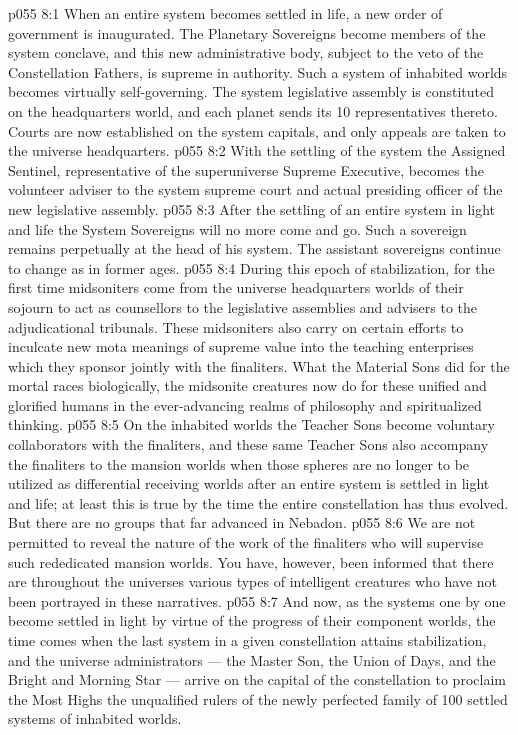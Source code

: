 \vs p055 8:1 When an entire system becomes settled in life, a new order of government is inaugurated. The Planetary Sovereigns become members of the system conclave, and this new administrative body, subject to the veto of the Constellation Fathers, is supreme in authority. Such a system of inhabited worlds becomes virtually self\hyp{}governing. The system legislative assembly is constituted on the headquarters world, and each planet sends its 10 representatives thereto. Courts are now established on the system capitals, and only appeals are taken to the universe headquarters.
\vs p055 8:2 With the settling of the system the Assigned Sentinel, representative of the superuniverse Supreme Executive, becomes the volunteer adviser to the system supreme court and actual presiding officer of the new legislative assembly.
\vs p055 8:3 After the settling of an entire system in light and life the System Sovereigns will no more come and go. Such a sovereign remains perpetually at the head of his system. The assistant sovereigns continue to change as in former ages.
\vs p055 8:4 During this epoch of stabilization, for the first time midsoniters come from the universe headquarters worlds of their sojourn to act as counsellors to the legislative assemblies and advisers to the adjudicational tribunals. These midsoniters also carry on certain efforts to inculcate new mota meanings of supreme value into the teaching enterprises which they sponsor jointly with the finaliters. What the Material Sons did for the mortal races biologically, the midsonite creatures now do for these unified and glorified humans in the ever\hyp{}advancing realms of philosophy and spiritualized thinking.
\vs p055 8:5 \pc On the inhabited worlds the Teacher Sons become voluntary collaborators with the finaliters, and these same Teacher Sons also accompany the finaliters to the mansion worlds when those spheres are no longer to be utilized as differential receiving worlds after an entire system is settled in light and life; at least this is true by the time the entire constellation has thus evolved. But there are no groups that far advanced in Nebadon.
\vs p055 8:6 We are not permitted to reveal the nature of the work of the finaliters who will supervise such rededicated mansion worlds. You have, however, been informed that there are throughout the universes various types of intelligent creatures who have not been portrayed in these narratives.
\vs p055 8:7 \pc And now, as the systems one by one become settled in light by virtue of the progress of their component worlds, the time comes when the last system in a given constellation attains stabilization, and the universe administrators --- the Master Son, the Union of Days, and the Bright and Morning Star --- arrive on the capital of the constellation to proclaim the Most Highs the unqualified rulers of the newly perfected family of 100 settled systems of inhabited worlds.
